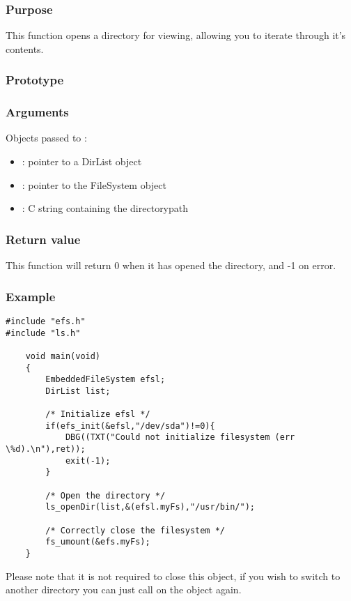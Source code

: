\subsubsection*{Purpose}
This function opens a directory for viewing, allowing you to iterate through
it's contents.
\subsubsection*{Prototype}
\subsubsection*{Arguments}
Objects passed to :
\begin{itemize}
	\item{: pointer to a DirList object}
	\item{: pointer to the FileSystem object}
	\item{: C string containing the directorypath}
\end{itemize}
\subsubsection*{Return value}
This function will return 0 when it has opened the directory, and -1 on error.\\

\subsubsection*{Example}
\lstset{numbers=left, stepnumber=1, numberstyle=\small, numbersep=5pt, tabsize=4}
\begin{lstlisting}
#include "efs.h"
#include "ls.h"

	void main(void)
	{
		EmbeddedFileSystem efsl;
		DirList list;

		/* Initialize efsl */
		if(efs_init(&efsl,"/dev/sda")!=0){
			DBG((TXT("Could not initialize filesystem (err \%d).\n"),ret));
			exit(-1);
		}

		/* Open the directory */
		ls_openDir(list,&(efsl.myFs),"/usr/bin/");

		/* Correctly close the filesystem */
		fs_umount(&efs.myFs);
	}
\end{lstlisting}

Please note that it is not required to close this object, if you wish to switch
to another directory you can just call  on the object again.
